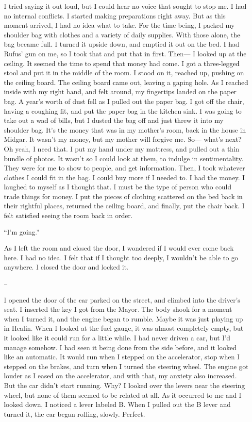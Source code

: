\documentclass[oneside]{book}
\begin{document}
I tried saying it out loud, but I could hear no voice that sought to stop me. I had no internal conflicts. I started making preparations right away. But as this moment arrived, I had no idea what to take. For the time being, I packed my shoulder bag with clothes and a variety of daily supplies. With those alone, the bag became full. I turned it upside down, and emptied it out on the bed. I had Rufus’ gun on me, so I took that and put that in first. Then— I looked up at the ceiling. It seemed the time to spend that money had come. I got a three-legged stool and put it in the middle of the room. I stood on it, reached up, pushing on the ceiling board. The ceiling board came out, leaving a gaping hole. As I reached inside with my right hand, and felt around, my fingertips landed on the paper bag. A year’s worth of dust fell as I pulled out the paper bag. I got off the chair, having a coughing fit, and put the paper bag in the kitchen sink. I was going to take out a wad of bills, but I dusted the bag off and just threw it into my shoulder bag. It’s the money that was in my mother’s room, back in the house in Midgar. It wasn’t my money, but my mother will forgive me. So— what’s next? Oh yeah, I need that. I put my hand under my mattress, and pulled out a thin bundle of photos. It wasn’t so I could look at them, to indulge in sentimentality. They were for me to show to people, and get information. Then, I took whatever clothes I could fit in the bag. I could buy more if I needed to. I had the money. I laughed to myself as I thought that. I must be the type of person who could trade things for money. I put the pieces of clothing scattered on the bed back in their rightful places, returned the ceiling board, and finally, put the chair back. I felt satisfied seeing the room back in order.

“I’m going.”

As I left the room and closed the door, I wondered if I would ever come back here. I had no idea. I felt that if I thought too deeply, I wouldn’t be able to go anywhere. I closed the door and locked it.

–

I opened the door of the car parked on the street, and climbed into the driver’s seat. I inserted the key I got from the Mayor. The body shook for a moment when I turned it, and the engine began to rumble. Maybe it was just playing up in Healin. When I looked at the fuel gauge, it was almost completely empty, but it looked like it could run for a little while. I had never driven a car, but I’d manage somehow. I had seen it being done from the side before, and it looked like an automatic. It would run when I stepped on the accelerator, stop when I stepped on the brakes, and turn when I turned the steering wheel. The engine got louder as I eased on the accelerator, and with that, my anxiety also increased. But the car didn’t start running. Why? I looked over the levers near the steering wheel, but none of them seemed to be related at all. As it occurred to me and I looked down, I noticed a lever labeled B. When I pulled out the B lever and turned it, the car began rolling, slowly. Perfect.
\end{document}
